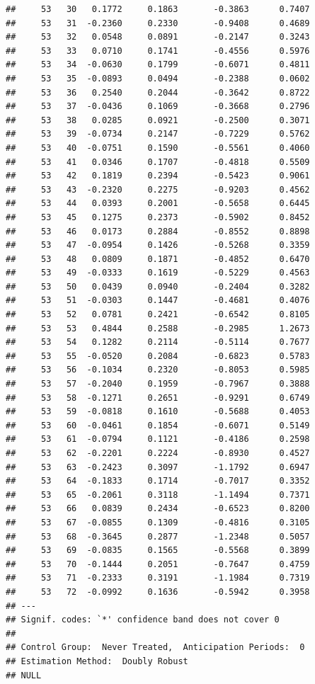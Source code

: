\documentclass[
]{article}
\begin{document}
\begin{verbatim}
##     53   30   0.1772     0.1863       -0.3863      0.7407  
##     53   31  -0.2360     0.2330       -0.9408      0.4689  
##     53   32   0.0548     0.0891       -0.2147      0.3243  
##     53   33   0.0710     0.1741       -0.4556      0.5976  
##     53   34  -0.0630     0.1799       -0.6071      0.4811  
##     53   35  -0.0893     0.0494       -0.2388      0.0602  
##     53   36   0.2540     0.2044       -0.3642      0.8722  
##     53   37  -0.0436     0.1069       -0.3668      0.2796  
##     53   38   0.0285     0.0921       -0.2500      0.3071  
##     53   39  -0.0734     0.2147       -0.7229      0.5762  
##     53   40  -0.0751     0.1590       -0.5561      0.4060  
##     53   41   0.0346     0.1707       -0.4818      0.5509  
##     53   42   0.1819     0.2394       -0.5423      0.9061  
##     53   43  -0.2320     0.2275       -0.9203      0.4562  
##     53   44   0.0393     0.2001       -0.5658      0.6445  
##     53   45   0.1275     0.2373       -0.5902      0.8452  
##     53   46   0.0173     0.2884       -0.8552      0.8898  
##     53   47  -0.0954     0.1426       -0.5268      0.3359  
##     53   48   0.0809     0.1871       -0.4852      0.6470  
##     53   49  -0.0333     0.1619       -0.5229      0.4563  
##     53   50   0.0439     0.0940       -0.2404      0.3282  
##     53   51  -0.0303     0.1447       -0.4681      0.4076  
##     53   52   0.0781     0.2421       -0.6542      0.8105  
##     53   53   0.4844     0.2588       -0.2985      1.2673  
##     53   54   0.1282     0.2114       -0.5114      0.7677  
##     53   55  -0.0520     0.2084       -0.6823      0.5783  
##     53   56  -0.1034     0.2320       -0.8053      0.5985  
##     53   57  -0.2040     0.1959       -0.7967      0.3888  
##     53   58  -0.1271     0.2651       -0.9291      0.6749  
##     53   59  -0.0818     0.1610       -0.5688      0.4053  
##     53   60  -0.0461     0.1854       -0.6071      0.5149  
##     53   61  -0.0794     0.1121       -0.4186      0.2598  
##     53   62  -0.2201     0.2224       -0.8930      0.4527  
##     53   63  -0.2423     0.3097       -1.1792      0.6947  
##     53   64  -0.1833     0.1714       -0.7017      0.3352  
##     53   65  -0.2061     0.3118       -1.1494      0.7371  
##     53   66   0.0839     0.2434       -0.6523      0.8200  
##     53   67  -0.0855     0.1309       -0.4816      0.3105  
##     53   68  -0.3645     0.2877       -1.2348      0.5057  
##     53   69  -0.0835     0.1565       -0.5568      0.3899  
##     53   70  -0.1444     0.2051       -0.7647      0.4759  
##     53   71  -0.2333     0.3191       -1.1984      0.7319  
##     53   72  -0.0992     0.1636       -0.5942      0.3958  
## ---
## Signif. codes: `*' confidence band does not cover 0
## 
## Control Group:  Never Treated,  Anticipation Periods:  0
## Estimation Method:  Doubly Robust
## NULL
\end{verbatim}
\end{document}
